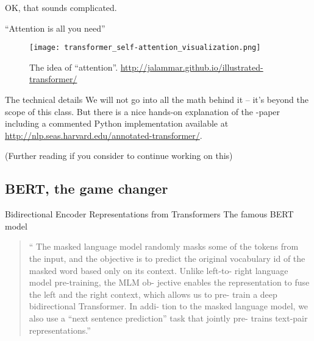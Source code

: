 \begin{frame}[plain]
  OK, that sounds complicated.
\end{frame}

\begin{frame}{``Attention  is all you need''}
\begin{figure}
	\centering
	\texttt{[image: transformer\_self-attention\_visualization.png]}
	\caption{The idea of ``attention''. \url{http://jalammar.github.io/illustrated-transformer/}}
	\label{fig:attention}
\end{figure}
\end{frame}


\begin{frame}{The technical details}
  We will not go into all the math behind it -- it's beyond the scope of this class. But there is a nice hands-on explanation of the \textcite{Vaswani2017}-paper including a commented Python implementation available at  \url{http://nlp.seas.harvard.edu/annotated-transformer/}.

  (Further reading if you consider to continue working on this)
\end{frame}


\subsection{BERT, the game changer}

\begin{frame}{Bidirectional Encoder Representations from Transformers}
The famous BERT \parencite{Devlin2018} model

\begin{quote}
`` The
masked language model randomly masks some of
the tokens from the input, and the objective is to
predict the original vocabulary id of the masked word based only on its context. Unlike left-to-
right language model pre-training, the MLM ob-
jective enables the representation to fuse the left
and the right context, which allows us to pre-
train a deep bidirectional Transformer. In addi-
tion to the masked language model, we also use
a “next sentence prediction” task that jointly pre-
trains text-pair representations.''
    \end{quote}

\end{frame}





